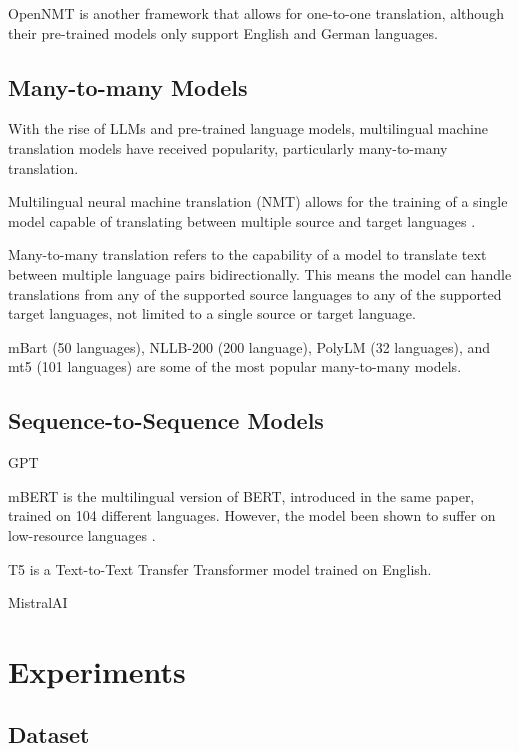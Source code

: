 \documentclass[a4paper]{article}
\begin{document}
OpenNMT \cite{klein-etal-2017-opennmt} is another framework that allows for one-to-one translation, although their pre-trained models only support English and German languages.

\subsection{Many-to-many Models}

With the rise of LLMs and pre-trained language models, multilingual machine translation models have received popularity, particularly many-to-many translation.

Multilingual neural machine translation (NMT) allows for the training of a single model capable of translating between multiple source and target languages \cite{aharoni-2019-massively-multilingual}.

Many-to-many translation refers to the capability of a model to translate text between multiple language pairs bidirectionally. This means the model can handle translations from any of the supported source languages to any of the supported target languages, not limited to a single source or target language.

mBart \cite{liu-2020-mbart} (50 languages), NLLB-200 \cite{nllb200} (200 language), PolyLM \cite{wei-2023-polylm} (32 languages), and mt5 \cite{xue-2021-mt5} (101 languages) are some of the most popular many-to-many models.


\subsection{Sequence-to-Sequence Models}

GPT \cite{openai-2024-gpt4}

mBERT \cite{devlin-2019-bert} is the multilingual version of BERT, introduced in the same paper, trained on 104 different languages. However, the model been shown to suffer on low-resource languages \cite{wu-2020-mbert-are-all}.

T5 \cite{raffel-2023-t5} is a Text-to-Text Transfer Transformer model trained on English.

MistralAI \cite{jiang-2023-mistral-7b}


\section{Experiments}

\subsection{Dataset}
\end{document}

